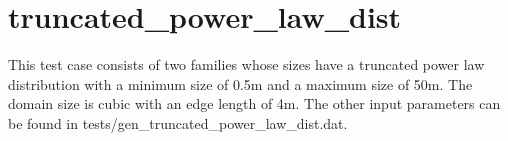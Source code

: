 \documentclass[letterpaper,10pt,english]{sphinxmanual}
\begin{document}
\begin{DUlineblock}{0em}
\item[] 
\item[] 
\end{DUlineblock}

{\hfill{}\hfill}

\begin{DUlineblock}{0em}
\item[] 
\item[] 
\end{DUlineblock}

{\hfill{}\hfill}

\begin{DUlineblock}{0em}
\item[] 
\item[] 
\end{DUlineblock}


\section{truncated\_power\_law\_dist}
\label{examples:truncated-power-law-dist}
This test case consists of two families whose sizes have a truncated power law distribution with a minimum size of 0.5m and a maximum size of 50m. The domain size is cubic with an edge length of 4m. The other input parameters can be found in tests/gen\_truncated\_power\_law\_dist.dat.
\end{document}
